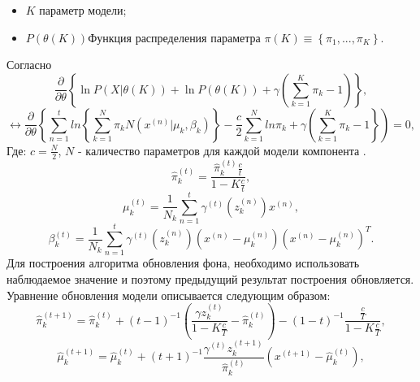 \begin{itemize}
	\item $K$ параметр модели;
	\item $P\left(\theta\left(K\right)\right)$Функция распределения параметра $\pi\left(K\right)\equiv\left\{\pi_1, ..., \pi_K\right\}$.
\end{itemize}

Согласно \cite{Bishop2006}
\begin{equation}\label{eq13}
\frac{\partial}{\partial\theta}\left\{\ln P\left(X|\theta\left(K\right)\right)+\ln P\left(\theta\left(K\right)\right)+\gamma\left(\sum^K_{k=1}\pi_k-1\right)\right\},
\end{equation}
\begin{equation}\label{eq14}
\longleftrightarrow \frac{\partial}{\partial\theta}\left\{\sum^t_{n=1}ln\left\{\sum^N_{k=1}\pi_kN\left(x^{\left(n\right)}|\mu_k,\beta_k\right)\right\}-\frac{c}{2}\sum^N_{k=1}ln \pi_k + \gamma\left(\sum^K_{k=1}\pi_k-1\right\}\right) = 0,
\end{equation}
Где:
 $c=\frac{N}{2}$, $N$ - каличество параметров для каждой модели компонента \cite{Figueiredo2002}.
\begin{equation}\label{eq15}
\hat{\pi}^{\left(t\right)}_k = \frac{\hat{\pi}^{\left(t\right)}_k\frac{c}{t}}{1-K\frac{c}{t}},
\end{equation}
\begin{equation}\label{eq16}
\mu^{\left(t\right)}_k = \frac{1}{N_k}\sum^t_{n=1}\gamma^{\left(t\right)}\left(z^{\left(n\right)}_k\right)x^{\left(n\right)},
\end{equation}
\begin{equation}\label{eq17}
\beta^{\left(t\right)}_k =\frac{1}{N_k}\sum^t_{n=1}\gamma^{\left(t\right)}\left(z^{\left(n\right)}_k\right)\left(x^{\left(n\right)}-\mu^{\left(n\right)}_k\right)\left(x^{\left(n\right)}-\mu^{\left(n\right)}_k\right)^T.
\end{equation}
Для построения алгоритма обновления фона, необходимо использовать наблюдаемое значение и поэтому предыдущий результат построения обновляется. Уравнение обновления модели описывается следующим образом:
\begin{equation}\label{eq18}
\hat{\pi}^{\left(t+1\right)}_k=\hat{\pi}^{\left(t\right)}_k + \left(t-1\right)^{-1} \left(\frac{\gamma z^{\left(t\right)}_k}{1-K\frac{c}{T}} - \hat{\pi}^{\left(t\right)}_k\right) - \left(1-t\right)^{-1} \frac{\frac{c}{T}}{1-K\frac{c}{T}},
\end{equation}
\begin{equation}\label{eq19}
\hat{\mu}^{\left(t+1\right)}_k = \hat{\mu}^{\left(t\right)}_k + \left(t+1\right)^{-1} \frac{\gamma^{\left(t\right)}z^{\left(t+1\right)}_k}{\hat{\pi}^{\left(t\right)}_k}\left(x^{\left(t+1\right)}-\hat{\mu}^{\left(t\right)}_k\right),
\end{equation}
